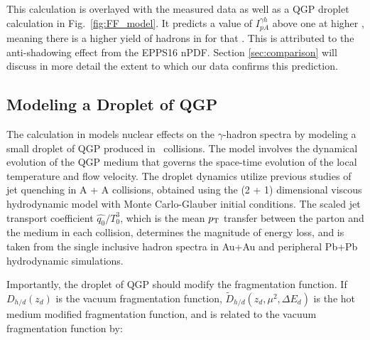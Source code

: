 This calculation is overlayed with the measured data as well as a QGP droplet calculation in Fig.~\ref{fig:FF_model}. It predicts a value of $I_{pA}^{\gamma h}$ above one at higher \zt, meaning there is a higher yield of hadrons in \pPb for that \zt. This is attributed to the anti-shadowing effect from the EPPS16 nPDF. Section \ref{sec:comparison} will discuss in more detail the extent to which our data confirms this prediction. 

\FloatBarrier
\subsection{Modeling a Droplet of QGP}
The calculation in \cite{Xie2021} models nuclear effects on the $\gamma$-hadron spectra by modeling a small droplet of QGP produced in \pPb~collisions. The model involves the dynamical evolution of the QGP medium that governs the space-time evolution of the local temperature and flow velocity. The droplet dynamics utilize previous studies of jet quenching in A + A collisions, obtained using the (2 + 1) dimensional viscous hydrodynamic model with Monte Carlo-Glauber initial conditions. The scaled jet transport coefficient $\hat{q_0}/T^3_0$, which is the mean $p_{\mathrm{T}}$ transfer between the parton and the medium in each collision, determines the magnitude of energy loss, and is taken from the single inclusive hadron spectra in Au+Au and peripheral Pb+Pb hydrodynamic simulations. 

Importantly, the droplet of QGP should modify the fragmentation function. If $D_{h / d}\left(z_{d}\right)$ is the vacuum fragmentation function, $\tilde{D}_{h / d}\left(z_{d}, \mu^{2}, \Delta E_{d}\right)$ is the hot medium modified fragmentation function, and is related to the vacuum fragmentation function by:

